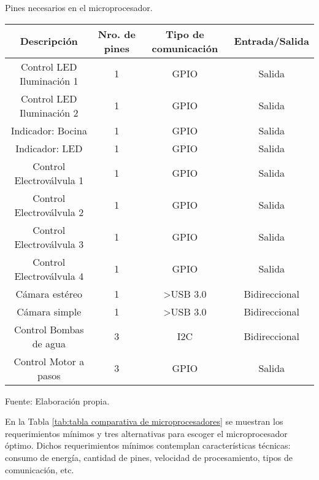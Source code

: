 
\begin{mytable}[H]
	\footnotesize\centering
	\caption{Pines necesarios en el microprocesador.}
	\label{tab:pines necesarios en el microprocesador}
	\begin{tabular}{|c|c|c|c|}
		\hline
		\textbf{Descripción} & \textbf{Nro. de pines} & \textbf{Tipo de comunicación} & \textbf{Entrada/Salida} \\ \hline
		Control LED Iluminación 1 & 1 & GPIO                  & Salida        \\ \hline
		Control LED Iluminación 2 & 1 & GPIO                  & Salida        \\ \hline
		Indicador: Bocina         & 1 & GPIO                  & Salida        \\ \hline
		Indicador: LED            & 1 & GPIO                  & Salida        \\ \hline
		Control Electroválvula 1  & 1 & GPIO                  & Salida        \\ \hline
		Control Electroválvula 2  & 1 & GPIO                  & Salida        \\ \hline
		Control Electroválvula 3  & 1 & GPIO                  & Salida        \\ \hline
		Control Electroválvula 4  & 1 & GPIO                  & Salida        \\ \hline
		Cámara estéreo            & 1 & \textgreater{}USB 3.0 & Bidireccional \\ \hline
		Cámara simple             & 1 & \textgreater{}USB 3.0 & Bidireccional \\ \hline
		Control Bombas de agua    & 3 & I2C                   & Bidireccional \\ \hline
		Control Motor a pasos     & 3 & GPIO                  & Salida        \\ \hline
	\end{tabular}
	\begin{myflushcenteraftertable}	
		Fuente: Elaboración propia.
	\end{myflushcenteraftertable}
\end{mytable}

En la Tabla \ref{tab:tabla comparativa de microprocesadores} se muestran los requerimientos mínimos y tres alternativas para escoger el microprocesador óptimo. Dichos requerimientos mínimos contemplan características técnicas: consumo de energía, cantidad de pines, velocidad de procesamiento, tipos de comunicación, etc.

